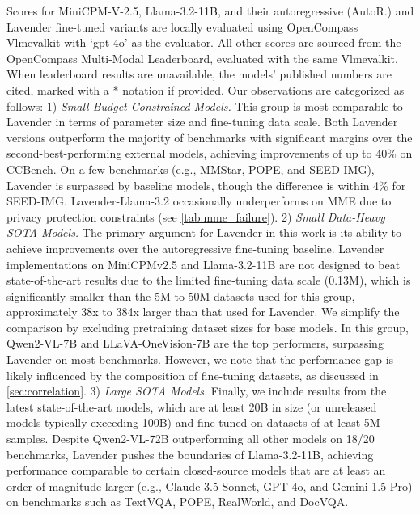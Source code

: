 \begin{table*}[ht]
{    Scores for MiniCPM-V-2.5, Llama-3.2-11B, and their autoregressive (AutoR.) and Lavender fine-tuned variants are locally evaluated using OpenCompass Vlmevalkit \cite{duan2024vlmevalkit} with `gpt-4o' as the evaluator. All other scores are sourced from the OpenCompass Multi-Modal Leaderboard, evaluated with the same Vlmevalkit. When leaderboard results are unavailable, the models' published numbers are cited, marked with a * notation if provided.
    Our observations are  categorized as follows:  
    1) \textit{Small Budget-Constrained Models.}  
    This group is most comparable to Lavender in terms of parameter size and fine-tuning data scale. Both Lavender versions outperform the majority of benchmarks with significant margins over the second-best-performing external models, achieving improvements of up to 40\% on CCBench. On a few benchmarks (e.g., MMStar, POPE, and SEED-IMG), Lavender is surpassed by baseline models, though the difference is within 4\% for SEED-IMG. Lavender-Llama-3.2 occasionally underperforms on MME due to privacy protection constraints (see \cref{tab:mme_failure}). 
    2) \textit{Small Data-Heavy SOTA Models.}  
    The primary argument for Lavender in this work is its ability to achieve improvements over the autoregressive fine-tuning baseline. Lavender implementations on MiniCPMv2.5 and Llama-3.2-11B are not designed to beat state-of-the-art results due to the limited fine-tuning data scale (0.13M), which is significantly smaller than the 5M to 50M datasets used for this group, approximately 38x to 384x larger than that used for Lavender.  
    We simplify the comparison by excluding pretraining dataset sizes for base models. In this group, Qwen2-VL-7B and LLaVA-OneVision-7B are the top performers, surpassing Lavender on most benchmarks. However, we note that the performance gap is likely influenced by the composition of fine-tuning datasets, as discussed in \cref{sec:correlation}.  
    3) \textit{Large SOTA Models.}  
    Finally, we include results from the latest state-of-the-art models, which are at least 20B in size (or unreleased models typically exceeding 100B) and fine-tuned on datasets of at least 5M samples.  
    Despite Qwen2-VL-72B outperforming all other models on 18/20 benchmarks, Lavender pushes the boundaries of Llama-3.2-11B, achieving performance comparable to certain closed-source models that are at least an order of magnitude larger (e.g., Claude-3.5 Sonnet, GPT-4o, and Gemini 1.5 Pro) on benchmarks such as TextVQA, POPE, RealWorld, and DocVQA.
    }
    \label{tab:main_table_full}
\end{table*}
